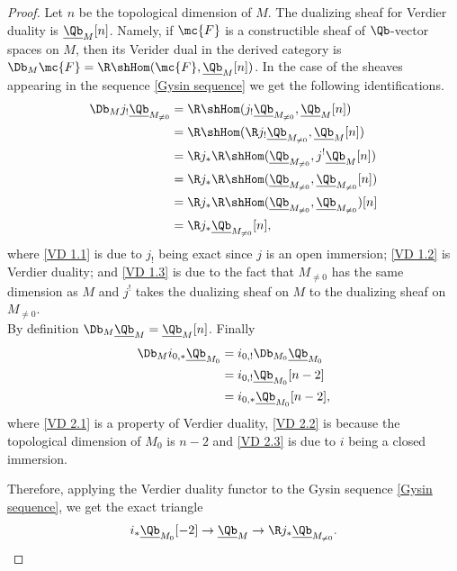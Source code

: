 \begin{proof}
Let $n$ be the topological dimension of $M$. The dualizing sheaf for Verdier duality is $\underline{\Qb}_M[n]$. Namely, if $\mc{F}$ is a constructible sheaf of $\Qb$-vector spaces on $M$, then its Verider dual in the derived category is $\Db_M \mc{F} = \R \shHom(\mc{F}, \underline{\Qb}_M[n])$.
In the case of the sheaves appearing in the sequence \eqref{Gysin sequence} we get the following identifications.
\begin{align}
\Db_M j_! \underline{\Qb}_{M_{\neq 0}} &= \R \shHom(j_! \underline{\Qb}_{M_{\neq 0}}, \underline{\Qb}_M[n]) \\
                                       &= \R \shHom(\R j_! \underline{\Qb}_{M_{\neq 0}}, \underline{\Qb}_M[n]) \label{VD 1.1}\\
                                       &= \R j_* \R \shHom(\underline{\Qb}_{M_{\neq 0}}, j^!\underline{\Qb}_M[n]) \label{VD 1.2}\\
                                       &= \R j_* \R \shHom(\underline{\Qb}_{M_{\neq 0}}, \underline{\Qb}_{M_{\neq 0}}[n]) \label{VD 1.3} \\
                                       &= \R j_* \R \shHom(\underline{\Qb}_{M_{\neq 0}}, \underline{\Qb}_{M_{\neq 0}})[n] \label{VD 1.4} \\
                                       &= \R j_* \underline{\Qb}_{M_{\neq 0}}[n],
\end{align}
where \eqref{VD 1.1} is due to $j_!$ being exact since $j$ is an open immersion; \eqref{VD 1.2} is Verdier duality; and \eqref{VD 1.3} is due to the fact that $M_{\neq 0}$ has the same dimension as $M$ and $j^!$ takes the dualizing sheaf on $M$ to the dualizing sheaf on $M_{\neq 0}$.\\
By definition $\Db_M \underline{\Qb}_M = \underline{\Qb}_M[n]$. Finally
\begin{align}
\Db_M i_{0,*} \underline{\Qb}_{M_0} &= i_{0,!} \Db_{M_0} \underline{\Qb}_{M_0} \label{VD 2.1}\\
                                &= i_{0,!} \underline{\Qb}_{M_0}[n-2] \label{VD 2.2}\\
                                &= i_{0,*} \underline{\Qb}_{M_0}[n-2] \label{VD 2.3},
\end{align}
where \eqref{VD 2.1} is a property of Verdier duality, \eqref{VD 2.2} is because the topological dimension of $M_0$ is $n-2$ and \eqref{VD 2.3} is due to $i$ being a closed immersion.

Therefore, applying the Verdier duality functor to the Gysin sequence \eqref{Gysin sequence}, we get the exact triangle
\begin{equation}
i_* \underline{\Qb}_{M_0}[-2] \to \underline{\Qb}_M \to \R j_* \underline{\Qb}_{M_{\neq 0}}.
\end{equation}


\end{proof}
